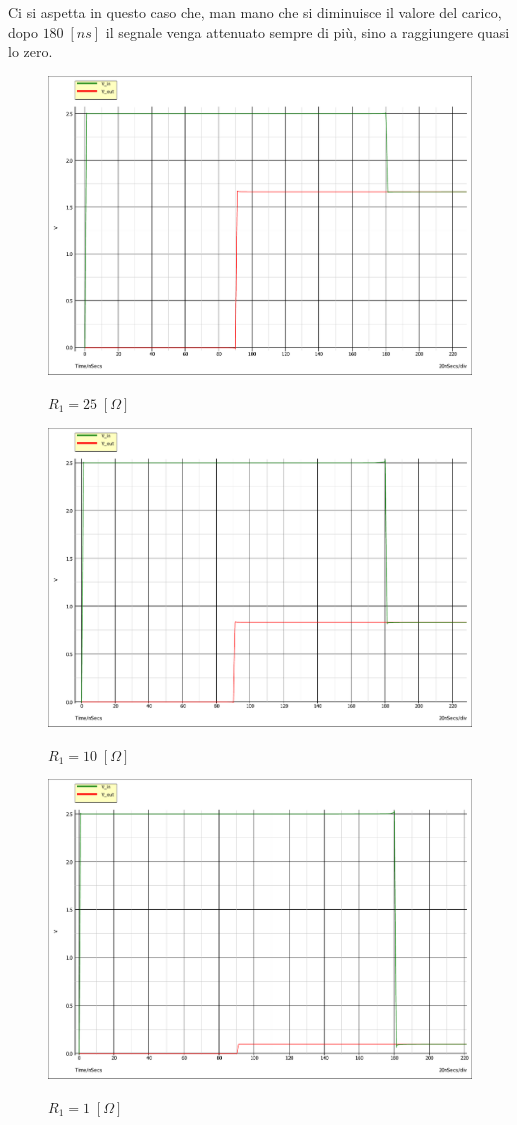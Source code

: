 \documentclass[a4paper,12pt]{report}
\begin{document}
Ci si aspetta in questo caso che, man mano che si diminuisce il valore del carico, dopo $180 \; [ns]$ il segnale venga attenuato sempre di più, sino a raggiungere quasi lo zero. 

\begin{figure}[!htb]
	\centering
	\includegraphics[width=.8\textwidth]{pictures/25ohm.pdf}
	\label{ergccwxxg}
	\caption{\label{luegreccvvvgegl} \small $R_1 = 25 \; [\Omega]$ }
\end{figure}

\begin{figure}[!htb]
	\centering
	\includegraphics[width=.8\textwidth]{pictures/10ohm.pdf}
	\label{ergccwxxxxg}
	\caption{\label{luegrecczzvvvgegl} \small $R_1 = 10 \; [\Omega]$ }
\end{figure}

\begin{figure}[!htb]
	\centering
	\includegraphics[width=.8\textwidth]{pictures/1ohm.pdf}
	\label{ergccwxxxxg}
	\caption{\label{luegrecczzvvvgegl} \small $R_1 = 1 \; [\Omega]$ }
\end{figure}
\end{document}
